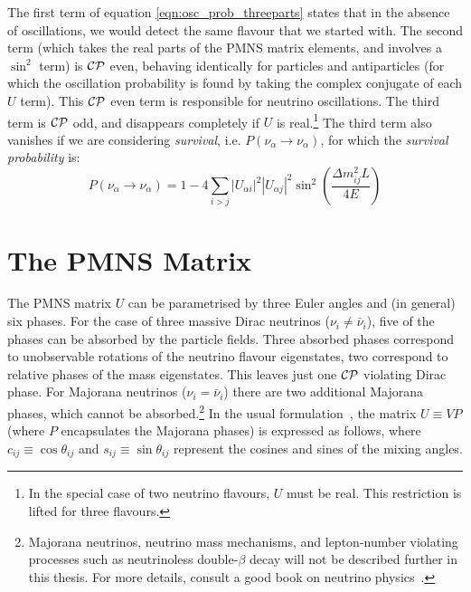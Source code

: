 The first term of equation \eqref{eqn:osc_prob_threeparts} states that in the absence of oscillations, we would detect the same flavour that we started with. The second term (which takes the real parts of the PMNS matrix elements, and involves a $\sin^2$ term) is $\mathcal{C}\mathcal{P}$ even, behaving identically for particles and antiparticles (for which the oscillation probability is found by taking the complex conjugate of each $U$ term). This $\mathcal{C}\mathcal{P}$ even term is responsible for neutrino oscillations. The third term is $\mathcal{C}\mathcal{P}$ odd, and disappears completely if $U$ is real.\footnote{In the special case of two neutrino flavours, $U$ must be real. This restriction is lifted for three flavours.} The third term also vanishes if we are considering \emph{survival}, i.e. $P(\nu_\alpha \rightarrow \nu_\alpha)$, for which the \emph{survival probability} is:
\begin{equation}\label{eqn:survival_probability}
P(\nu_\alpha \rightarrow \nu_\alpha) = 1 - 4\sum_{i>j} |U_{\alpha i}|^2 |U_{\alpha j}|^2 \sin^2 \left(\frac{\Delta m_{ij}^2 L}{4E}\right)
\end{equation}

\section{The PMNS Matrix}
The PMNS matrix $U$ can be parametrised by three Euler angles and (in general) six phases. For the case of three massive Dirac neutrinos ($\nu_i \ne \bar{\nu}_i$), five of the phases can be absorbed by the particle fields. Three absorbed phases correspond to unobservable rotations of the neutrino flavour eigenstates, two correspond to relative phases of the mass eigenstates. This leaves just one $\mathcal{C}\mathcal{P}$ violating Dirac phase. For Majorana neutrinos ($\nu_i = \bar{\nu}_i$) there are two additional Majorana phases, which cannot be absorbed.\footnote{Majorana neutrinos, neutrino mass mechanisms, and lepton-number violating processes such as neutrinoless double-$\beta$ decay will not be described further in this thesis. For more details, consult a good book on neutrino physics~\citep{Zuber2004,Giunti2007}.} In the usual formulation~\citep{PDG2011}, the matrix $U \equiv VP$ (where $P$ encapsulates the Majorana phases) is expressed as follows, where $c_{ij} \equiv \cos\theta_{ij}$ and $s_{ij} \equiv \sin\theta_{ij}$ represent the cosines and sines of the mixing angles.

